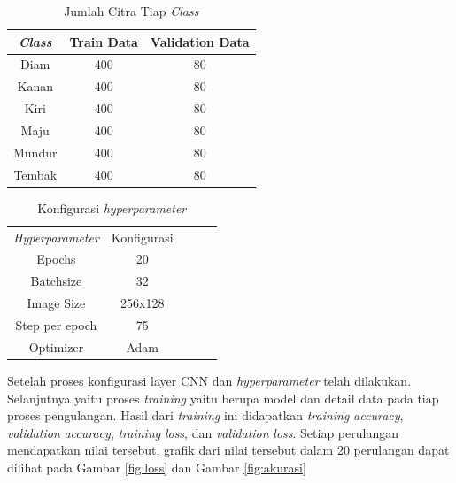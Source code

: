 \begin{table}[H]
  \centering
  \caption{Jumlah Citra Tiap \emph{Class}}
  \label{tab:tiapclass}
  \begin{tabular}{|c|c|c|}
  \hline
  \emph{Class}  & Train Data & Validation Data \\ \hline
  Diam   & 400        & 80              \\ \hline
  Kanan  & 400        & 80              \\ \hline
  Kiri   & 400        & 80              \\ \hline
  Maju   & 400        & 80              \\ \hline
  Mundur & 400        & 80              \\ \hline
  Tembak & 400        & 80              \\ \hline
  \end{tabular}
\end{table}

\begin{table}[H]
  \centering
  \caption{Konfigurasi \emph{hyperparameter}}
  \label{fig:hyperparameter}
  \begin{tabular}{|c|c|lll}
  \cline{1-2}
  \emph{Hyperparameter} & Konfigurasi \\ \cline{1-2}
  Epochs         & 20 \\ \cline{1-2}
  Batchsize      & 32 \\ \cline{1-2}
  Image Size     & 256x128 \\ \cline{1-2}
  Step per epoch      & 75 \\ \cline{1-2}
  Optimizer      & Adam \\ \cline{1-2}
  \end{tabular}
\end{table}

Setelah proses konfigurasi layer CNN dan \emph{hyperparameter} telah dilakukan. Selanjutnya yaitu proses \emph{training} yaitu berupa model dan detail data pada tiap proses pengulangan. Hasil dari \emph{training} ini didapatkan \emph{training} \emph{accuracy}, \emph{validation} \emph{accuracy}, \emph{training} \emph{loss}, dan \emph{validation} \emph{loss}. Setiap perulangan mendapatkan nilai tersebut, grafik dari nilai tersebut dalam 20 perulangan dapat dilihat pada Gambar \ref*{fig:loss} dan Gambar \ref*{fig:akurasi}

